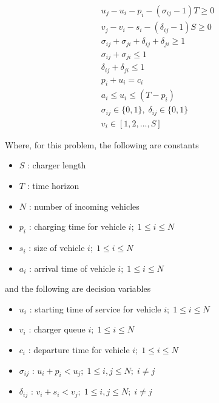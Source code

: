 \documentclass[letterpaper, 10pt, conference]{IEEEtran}
\begin{document}
\begin{subequations}
\label{eq:bapconstrs}
\begin{align}
    u_j - u_i - p_i - (\sigma_{ij} - 1)T \geq 0                 \label{subeq:baptime}         \\
    v_j - v_i - s_i - (\delta_{ij} - 1)S \geq 0                 \label{subeq:bapspace}        \\
    \sigma_{ij} + \sigma_{ji} + \delta_{ij} + \delta_{ji} \geq 1  \label{subeq:bapvalid_pos}    \\
    \sigma_{ij} + \sigma_{ji} \leq 1                            \label{subeq:bapsigma}        \\
    \delta_{ij} + \delta_{ji} \leq 1                            \label{subeq:bapdelta}        \\
    p_i + u_i = c_i                                            \label{subeq:bapdetach}       \\
    a_i \leq u_i \leq (T - p_i)                                \label{subeq:bapvalid_starts} \\
    \sigma_{ij} \in \{0,1\},\;\delta_{ij} \in \{0,1\}\;         \label{subeq:bapsdspace}      \\
    v_i \in [1,2,...,S]                                      \label{subeq:bapvspace}
\end{align}
\end{subequations}

\noindent
Where, for this problem, the following are constants

\begin{itemize}
	\item $S$   : charger length
	\item $T$   : time horizon
	\item $N$   : number of incoming vehicles
	\item $p_i$ : charging time for vehicle $i;\; 1 \leq i \leq N$
	\item $s_i$ : size of vehicle $i;\; 1 \leq i \leq N$
	\item $a_i$ : arrival time of vehicle $i;\; 1 \leq i \leq N$
\end{itemize}

\noindent
and the following are decision variables

\begin{itemize}
    \item $u_i$         : starting time of service for vehicle $i;\; 1 \leq i \leq N$
    \item $v_i$         : charger queue $i;\; 1 \leq i \leq N$
    \item $c_i$         : departure time for vehicle $i;\; 1 \leq i \leq N$
    \item $\sigma_{ij}$ : $u_i + p_i < u_j;\; 1 \leq i,j \leq N ;\; i \neq j $
    \item $\delta_{ij}$ : $v_i + s_i < v_j;\; 1 \leq i,j \leq N ;\; i \neq j $
\end{itemize}
\end{document}
